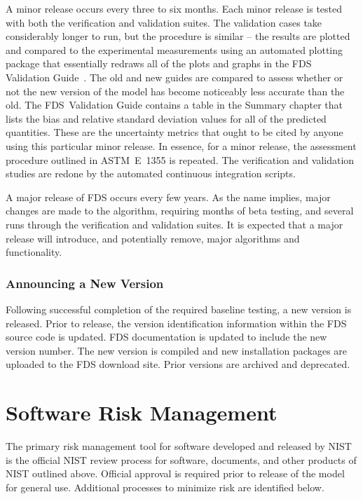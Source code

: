 \documentclass[11pt]{book}
\begin{document}
A minor release occurs every three to six months. Each minor release is tested with both the verification and validation suites. The validation cases take considerably longer to run, but the procedure is similar -- the results are plotted and compared to the experimental measurements using an automated plotting package that essentially redraws all of the plots and graphs in the FDS Validation Guide~\cite{FDS_Validation_Guide}. The old and new guides are compared to assess whether or not the new version of the model has become noticeably less accurate than the old. The FDS~Validation Guide contains a table in the Summary chapter that lists the bias and relative standard deviation values for all of the predicted quantities. These are the uncertainty metrics that ought to be cited by anyone using this particular minor release. In essence, for a minor release, the assessment procedure outlined in ASTM~E~1355 is repeated. The verification and validation studies are redone by the automated continuous integration scripts.

A major release of FDS occurs every few years. As the name implies, major changes are made to the algorithm, requiring months of beta testing, and several runs through the verification and validation suites. It is expected that a major release will introduce, and potentially remove, major algorithms and functionality.


\subsection{Announcing a New Version}

Following successful completion of the required baseline testing, a new version is released.  Prior to release, the version identification information within the FDS source code is updated.  FDS documentation is updated to include the new version number.  The new version is compiled and new installation packages are uploaded to the FDS download site.  Prior versions are archived and deprecated.



\chapter{Software Risk Management}

The primary risk management tool for software developed and released by NIST is the official NIST review process for software, documents, and other products of NIST outlined above. Official approval is required prior to release of the model for general use. Additional processes to minimize risk are identified below.
\end{document}
